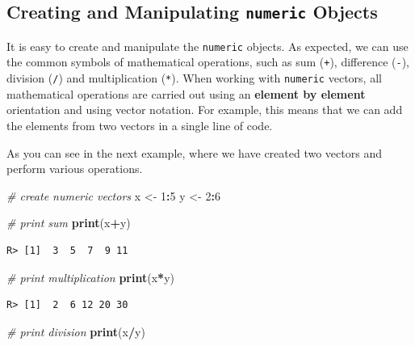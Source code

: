 \documentclass[
  12pt,
]{book}
\newenvironment{Shaded}{\begin{snugshade}}{\end{snugshade}}
\newcommand{\CommentTok}[1]{\textcolor[rgb]{0.37,0.37,0.37}{\textit{#1}}}
\newcommand{\DecValTok}[1]{\textcolor[rgb]{0.06,0.06,0.06}{#1}}
\newcommand{\KeywordTok}[1]{\textcolor[rgb]{0.27,0.27,0.27}{\textbf{#1}}}
\newcommand{\NormalTok}[1]{#1}
\newcommand{\OperatorTok}[1]{\textcolor[rgb]{0.43,0.43,0.43}{\textbf{#1}}}
\newcommand{\StringTok}[1]{\textcolor[rgb]{0.5,0.5,0.5}{#1}}
\begin{document}
\hypertarget{creating-and-manipulating-numeric-objects}{%
\subsection{\texorpdfstring{Creating and Manipulating \texttt{numeric} Objects}{Creating and Manipulating numeric Objects}}\label{creating-and-manipulating-numeric-objects}}

It is easy to create and manipulate the \texttt{numeric} objects. As expected, we can use the common symbols of mathematical operations, such as sum (\texttt{+}), difference (\texttt{-}), division (\texttt{/}) and multiplication (\texttt{*}). When working with \texttt{numeric} vectors, all mathematical operations are carried out using an \textbf{element by element} orientation and using vector notation. For example, this means that we can add the elements from two vectors in a single line of code.

As you can see in the next example, where we have created two vectors and perform various operations.

\begin{Shaded}
\begin{Highlighting}[]
\CommentTok{# create numeric vectors}
\NormalTok{x <-}\StringTok{ }\DecValTok{1}\OperatorTok{:}\DecValTok{5}
\NormalTok{y <-}\StringTok{ }\DecValTok{2}\OperatorTok{:}\DecValTok{6}

\CommentTok{# print sum}
\KeywordTok{print}\NormalTok{(x}\OperatorTok{+}\NormalTok{y)}
\end{Highlighting}
\end{Shaded}

\begin{verbatim}
R> [1]  3  5  7  9 11
\end{verbatim}

\begin{Shaded}
\begin{Highlighting}[]
\CommentTok{# print multiplication}
\KeywordTok{print}\NormalTok{(x}\OperatorTok{*}\NormalTok{y)}
\end{Highlighting}
\end{Shaded}

\begin{verbatim}
R> [1]  2  6 12 20 30
\end{verbatim}

\begin{Shaded}
\begin{Highlighting}[]
\CommentTok{# print division}
\KeywordTok{print}\NormalTok{(x}\OperatorTok{/}\NormalTok{y)}
\end{Highlighting}
\end{Shaded}
\end{document}

